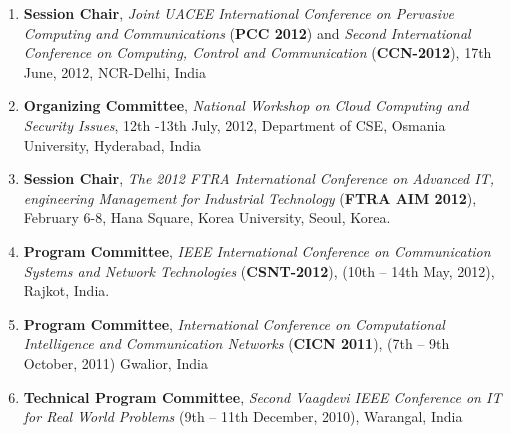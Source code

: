 \begin{enumerate}
\item
\textbf{Session Chair},\textit{ Joint UACEE International Conference on Pervasive Computing and Communications} (\textbf{PCC 2012}) and \textit{Second International Conference on Computing, Control and Communication }(\textbf{CCN-2012}), 17th June, 2012, NCR-Delhi, India

\item
\textbf{Organizing Committee}, \textit{National Workshop on Cloud Computing and Security Issues}, 12th -13th July, 2012, Department of CSE, Osmania University, Hyderabad, India

\item
\textbf{Session Chair}, \textit{The 2012 FTRA International Conference on Advanced IT, engineering Management for Industrial Technology} (\textbf{FTRA AIM 2012}), February 6-8, Hana Square, Korea University, Seoul, Korea.

\item
\textbf{Program Committee}, \textit{IEEE International Conference on Communication Systems and Network Technologies} (\textbf{CSNT-2012}), (10th – 14th May, 2012), Rajkot, India.

\item
\textbf{Program Committee}, \textit{International Conference on Computational Intelligence and Communication Networks }(\textbf{CICN 2011}), (7th – 9th October, 2011) Gwalior, India

\item
\textbf{Technical Program Committee}, \textit{Second Vaagdevi IEEE Conference on IT for Real World Problems} (9th – 11th December, 2010), Warangal, India

\end{enumerate}